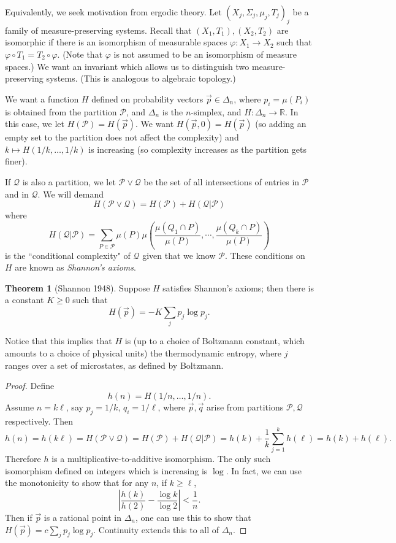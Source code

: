 \documentclass[12pt]{report}
\newcommand{\RR}{\mathbb{R}}
\newcommand{\dfn}[1]{\emph{#1}\index{#1}}
\theoremstyle{definition}
\newtheorem{theorem}{Theorem}[chapter]
\begin{document}
Equivalently, we seek motivation from ergodic theory. Let $(X_j, \Sigma_j, \mu_j, T_j)_j$ be a family of measure-preserving systems. Recall that $(X_1, T_1),(X_2,T_2)$ are isomorphic if there is an isomorphism of measurable spaces $\varphi: X_1 \to X_2$ such that $\varphi \circ T_1 = T_2 \circ \varphi$. (Note that $\varphi$ is not assumed to be an isomorphism of measure spaces.)
We want an invariant which allows us to distinguish two measure-preserving systems. (This is analogous to algebraic topology.)

We want a function $H$ defined on probability vectors $\vec p \in \Delta_n$, where $p_i = \mu(P_i)$ is obtained from the partition $\mathcal P$, and $\Delta_n$ is the $n$-simplex, and $H: \Delta_n \to \RR$. In this case, we let $H(\mathcal P) = H(\vec p)$.
We want $H(\vec p, 0) = H(\vec p)$ (so adding an empty set to the partition does not affect the complexity) and $k \mapsto H(1/k, \dots, 1/k)$ is increasing (so complexity increases as the partition gets finer).

If $\mathcal Q$ is also a partition, we let $\mathcal P \vee \mathcal Q$ be the set of all intersections of entries in $\mathcal P$ and in $\mathcal Q$. We will demand
$$H(\mathcal P \vee \mathcal Q) = H(\mathcal P) + H(\mathcal Q|\mathcal P)$$
where
$$H(\mathcal Q|\mathcal P) = \sum_{P \in \mathcal P} \mu(P)\mu\left(\frac{\mu(Q_1 \cap P)}{\mu(P)}, \cdots, \frac{\mu(Q_k \cap P)}{\mu(P)}\right)$$
is the ``conditional complexity" of $\mathcal Q$ given that we know $\mathcal P$.
These conditions on $H$ are known as \dfn{Shannon's axioms}.

\begin{theorem}[Shannon 1948]
Suppose $H$ satisfies Shannon's axioms; then there is a constant $K \geq 0$ such that
$$H(\vec p) = -K\sum_j p_j \log p_j.$$
\end{theorem}
Notice that this implies that $H$ is (up to a choice of Boltzmann constant, which amounts to a choice of physical units) the thermodynamic entropy, where $j$ ranges over a set of microstates, as defined by Boltzmann.
\begin{proof}
Define
$$h(n) = H(1/n, \dots, 1/n).$$
Assume $n = k\ell$, say $p_j = 1/k$, $q_i = 1/\ell$, where $\vec p,\vec q$ arise from partitions $\mathcal P,\mathcal Q$ respectively. Then
$$h(n) = h(k\ell) = H(\mathcal P \vee \mathcal Q) = H(\mathcal P) + H(\mathcal Q|\mathcal P) = h(k) + \frac{1}{k}\sum_{j=1}^k h(\ell) = h(k) + h(\ell).$$
Therefore $h$ is a multiplicative-to-additive isomorphism. The only such isomorphism defined on integers which is increasing is $\log$. In fact, we can use the monotonicity to show that for any $n$, if $k \geq \ell$,
$$\left|\frac{h(k)}{h(2)} - \frac{\log k}{\log 2}\right| < \frac{1}{n}.$$
Then if $\vec p$ is a rational point in $\Delta_n$,
one can use this to show that $H(\vec p) = c \sum_j p_j\log p_j$. Continuity extends this to all of $\Delta_n$.
\end{proof}
\end{document}
